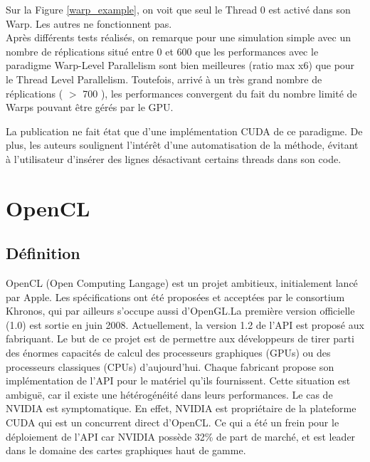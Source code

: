 \documentclass[a4paper,11pt]{report}
\begin{document}
{\newpage
 
\normalsize{
Sur la Figure \ref{warp_example}, on voit que seul le Thread 0 est activé dans son Warp. Les autres ne fonctionnent pas.\\

Après différents tests réalisés, on remarque pour une simulation simple avec un nombre de réplications situé entre 0 et 600 que les performances avec le paradigme Warp-Level Parallelism sont bien meilleures (ratio max x6) que pour le Thread Level Parallelism. Toutefois, arrivé à un très grand nombre de réplications ( $>$ 700 ), les performances convergent du fait du nombre limité de Warps pouvant être gérés par le GPU.\\
}

\normalsize{
La publication \cite{Passerat-Palmbach.etal.2011} ne fait état que d'une implémentation CUDA de ce paradigme. De plus, les auteurs soulignent l'intérêt d'une automatisation de la méthode, évitant à l'utilisateur d'insérer des lignes désactivant certains threads dans son code.
}


\chapter {OpenCL}

\section{Définition}
\vspace{6mm}
\normalsize{
OpenCL (Open Computing Langage) est un projet ambitieux, initialement lancé par Apple. Les spécifications ont été proposées et acceptées par le consortium Khronos, qui par ailleurs s'occupe aussi d'OpenGL.La première version officielle (1.0) est sortie en juin 2008. Actuellement, la version 1.2 de l'API est proposé aux fabriquant. Le but de ce projet est de permettre aux développeurs de tirer parti des énormes capacités de calcul des processeurs graphiques (GPUs) ou des processeurs classiques (CPUs) d'aujourd'hui. Chaque fabricant propose son implémentation de l'API pour le matériel qu'ils fournissent. Cette situation est ambiguë, car il existe une hétérogénéité dans leurs performances. Le cas de NVIDIA est symptomatique. En effet, NVIDIA est propriétaire de la plateforme CUDA qui est un concurrent direct d'OpenCL. Ce qui a été un frein pour le déploiement de l'API car NVIDIA possède 32\% de part de marché, et est leader dans le domaine des cartes graphiques haut de gamme.
}

}
\end{document}
